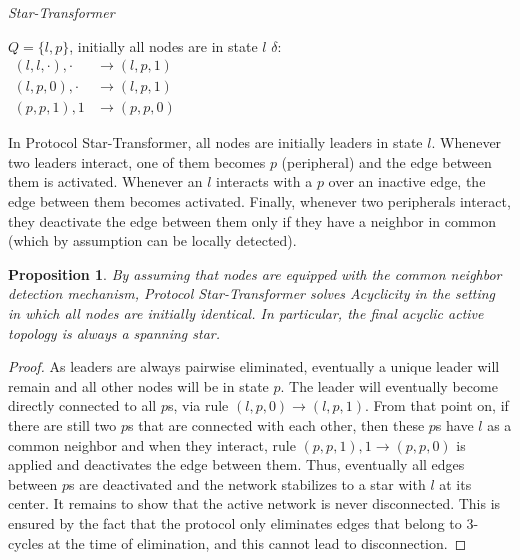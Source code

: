 \documentclass[preprint]{elsarticle}
\newcommand{\ra}{\rightarrow}
\newtheorem{proposition}{Proposition}
\begin{document}
\renewcommand{\algorithmiccomment}[1]{// #1}
\begin{algorithm}[!h]
  \caption{\emph{Star-Transformer}}\label{prot:star-transformer}
  \begin{algorithmic}
    \medskip
    \State $Q=\{l,p\}$, initially all nodes are in state $l$
    \State $\delta$: 
    \begin{align*}
    (l,l,\cdot),\cdot &\ra (l,p,1)\\
    (l,p,0),\cdot &\ra (l,p,1)\\
    (p,p,1),1&\ra (p,p,0)   
    \phantom{\hspace{10cm}}
    \end{align*}
    \State {}
  \end{algorithmic}
\end{algorithm}

In Protocol Star-Transformer, all nodes are initially leaders in state $l$. Whenever two leaders interact, one of them becomes $p$
(peripheral) and the edge between them is activated. Whenever an $l$ interacts with a $p$ over an inactive edge, the edge between them becomes activated. Finally, whenever two peripherals interact, they deactivate the edge between them only if they
have a neighbor in common (which by assumption can be locally detected).

\begin{proposition}
By assuming that nodes are equipped with the common neighbor detection mechanism, Protocol Star-Transformer solves Acyclicity in the setting in which all nodes are initially identical. In particular, the final acyclic active topology is always a spanning star.
\end{proposition}
\begin{proof}
As leaders are always pairwise eliminated, eventually a unique leader will remain and all other nodes will be in state $p$. The
leader will eventually become directly connected to all $p$s, via rule $(l,p,0)\ra (l,p,1)$. From that point
on, if there are still two $p$s that are connected with each other, then these $p$s 
have $l$ as a common neighbor and when they interact, rule $(p,p,1),1\ra (p,p,0)$
is applied and deactivates the edge between them. Thus, eventually all edges between $p$s
are deactivated and the network stabilizes to a star with $l$ at its center.
It remains to show that the active network is never disconnected. This is
ensured by the fact that the protocol only eliminates edges that belong to 3-cycles at the time of
elimination, and this cannot lead to disconnection.
\end{proof}
\end{document}
